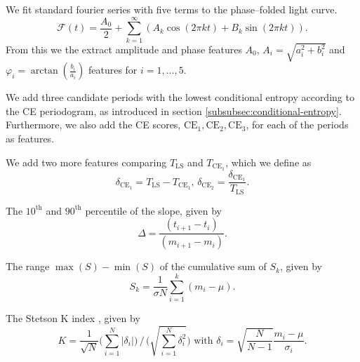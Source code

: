 \begin{enumerate}
 We fit standard fourier series with five terms to the phase--folded light curve.
\begin{equation}\label{eq:fourier-series-features}\mathcal{F}(t) = \frac{A_0}{2} + \sum_{k=1}^{\infty} ( A_k \cos(2 \pi k t) + B_k \sin(2 \pi k t) ).\end{equation}
From this we the extract amplitude and phase features $A_0$, $A_i = \sqrt{a_i^2 + b_i^2}$ and $\varphi_i = \arctan(\frac{b_i}{a_i})$ features for $i = 1, \ldots, 5$.

 We add three candidate periods with the lowest conditional entropy according to the CE periodogram, as introduced in section \ref{subsubsec:conditional-entropy}. Furthermore, we also add the CE scores, $\text{CE}_1, \text{CE}_2, \text{CE}_3$, for each of the periods as features.

 We add two more features comparing $T_{\text{LS}}$ and $T_{\text{CE}_1}$, which we define as
\begin{equation}\delta_{\text{CE}_1} = T_{\text{LS}} - T_{\text{CE}_1}, \, \delta_{\text{CE}_2} = \frac{\delta_{\text{CE}_1}}{T_{\text{LS}}}.\end{equation}

 The $10^\text{th}$ and $90^\text{th}$ percentile of the slope, given by
\begin{equation}\Delta = \frac{(t_{i+1} - t_i)}{(m_{i+1} - m_i)}.\end{equation}

 The range $\max(S) - \min(S)$ of the cumulative sum \citep{ellaway1978} of $S_k$, given by
\begin{equation}S_k = \frac{1}{\sigma N} \sum\limits_{i=1}^k (m_i - \mu) .\end{equation}

 The Stetson K index \citep{stetson1996}, given by
\begin{equation}K = \frac{1}{\sqrt{N}} \big( \sum\limits_{i=1}^N |\delta_i| \big) \, / \, \big( \sqrt{\sum\limits_{i=1}^N \delta_i^2} \big) \text{ with } \delta_i = \sqrt{\frac{N}{N-1}} \frac{m_i - \mu}{\sigma_i}.\end{equation}


\end{enumerate}

